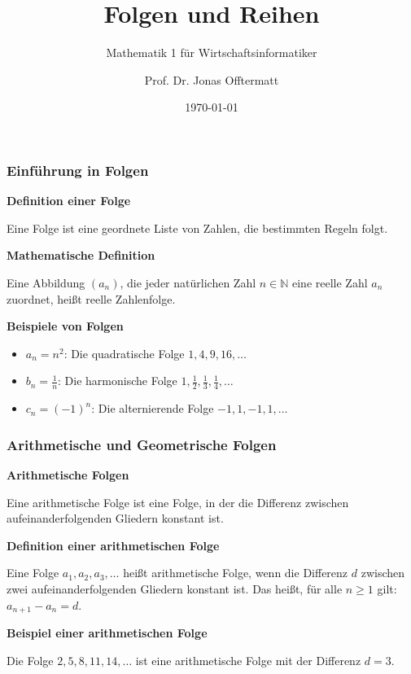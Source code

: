 \documentclass{beamer}
\title{Folgen und Reihen}
\subtitle{Mathematik 1 für Wirtschaftsinformatiker}
\author{Prof. Dr. Jonas Offtermatt}
\date{\today}
\begin{document}
\begin{frame}
    \frametitle{Einführung in Folgen}
  
    \textbf{Definition einer Folge}
  
    Eine Folge ist eine geordnete Liste von Zahlen, die bestimmten Regeln folgt.
  
    \vspace{0.5em}
  
    \textbf{Mathematische Definition}
  
    Eine Abbildung $(a_n)$, die jeder natürlichen Zahl $n \in \mathbb{N}$ eine reelle Zahl $a_n$ zuordnet, heißt reelle Zahlenfolge.
  
    \vspace{0.5em}
  
    \textbf{Beispiele von Folgen}
  
    \begin{itemize}
      \item $a_n = n^2$: Die quadratische Folge $1, 4, 9, 16, \ldots$
      \item $b_n = \frac{1}{n}$: Die harmonische Folge $1, \frac{1}{2}, \frac{1}{3}, \frac{1}{4}, \ldots$
      \item $c_n = (-1)^n$: Die alternierende Folge $-1, 1, -1, 1, \ldots$
    \end{itemize}
  \end{frame}
  
  \begin{frame}
    \frametitle{Arithmetische und Geometrische Folgen}
  
    \textbf{Arithmetische Folgen}
  
    Eine arithmetische Folge ist eine Folge, in der die Differenz zwischen aufeinanderfolgenden Gliedern konstant ist.
  
    \vspace{0.5em}
  
    \textbf{Definition einer arithmetischen Folge}
  
    Eine Folge $a_1, a_2, a_3, \ldots$ heißt arithmetische Folge, wenn die Differenz $d$ zwischen zwei aufeinanderfolgenden Gliedern konstant ist. Das heißt, für alle $n \geq 1$ gilt: $a_{n+1} - a_n = d$.
  
    \vspace{0.5em}
  
    \textbf{Beispiel einer arithmetischen Folge}
  
    Die Folge $2, 5, 8, 11, 14, \ldots$ ist eine arithmetische Folge mit der Differenz $d = 3$.
  
\end{frame}
  
\end{document}
